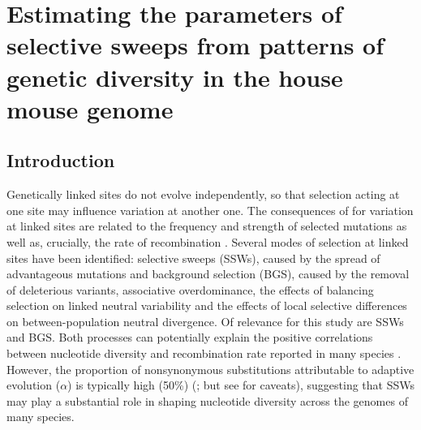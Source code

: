 

\chapter{Estimating the parameters of selective sweeps from patterns of genetic diversity in the house mouse genome}





%
%


\section{Introduction}

	Genetically linked sites do not evolve independently, so that selection acting at one site may influence variation at another one. The consequences of for variation at linked sites are related to the frequency and strength of selected mutations as well as, crucially, the rate of recombination \citep{RN124,RN206,RN287,RN157}. Several modes of selection at linked sites have been identified: selective sweeps (SSWs), caused by the spread of advantageous mutations and background selection (BGS), caused by the removal of deleterious variants, associative overdominance, the effects of balancing selection on linked neutral variability and the effects of local selective differences on between-population neutral divergence.	 Of relevance for this study are SSWs and BGS. Both processes can potentially explain the positive correlations between nucleotide diversity and recombination rate reported in many species \citep{RN117}. However, the proportion of nonsynonymous substitutions attributable to adaptive evolution ($\alpha$) is typically high (50\%) (\citealt{RN215}; but see \citealt{RN352} for caveats), suggesting that SSWs may play a substantial role in shaping nucleotide diversity across the genomes of many species.


